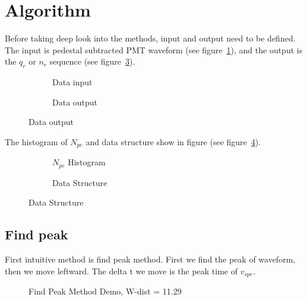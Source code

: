\section{Algorithm} %

Before taking deep look into the methods, input and output need to be defined. The input is pedestal subtracted PMT waveform (see figure~\ref{fig:input}), and the output is the $q_{r}$ or $n_{r}$ sequence (see figure~\ref{fig:output}). 

\begin{figure}[H]
    \begin{subfigure}{0.5\textwidth}
        \centering
        \scalebox{0.4}{}
        \caption{\label{fig:input} Data input}
    \end{subfigure}
    \begin{subfigure}{0.5\textwidth}
        \centering
        \scalebox{0.4}{}
        \caption{\label{fig:output} Data output}
    \end{subfigure}
\end{figure}

The histogram of $N_{pe}$ and data structure show in figure (see figure~\ref{fig:penum}). 

\begin{figure}[H]
    \begin{subfigure}{0.5\textwidth}
        \centering
        \scalebox{0.4}{}
        \caption{\label{fig:penum} $N_{pe}$ Histogram}
    \end{subfigure}
    \begin{subfigure}{0.5\textwidth}
        \centering
        \scalebox{0.4}{}
        \caption{\label{fig:set} Data Structure}
    \end{subfigure}
\end{figure}

\subsection{Find peak}
First intuitive method is find peak method. First we find the peak of waveform, then we move leftward. The delta t we move is the peak time of $v_{spe}$. 

\begin{figure}[H]
    \centering
    \scalebox{0.4}{}
    \caption{Find Peak Method Demo, W-dist = 11.29}
\end{figure}

